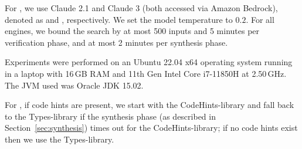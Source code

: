 \documentclass[conference]{IEEEtran}
\begin{document}
For \llm, we use Claude 2.1 and Claude 3 (both accessed via Amazon Bedrock), denoted as \llma and \llmb, respectively. We set the model temperature to $0.2$.
%
For all engines, we bound the search by at most 500 inputs and 5 minutes per verification phase, and at
most 2 minutes per synthesis phase. 

Experiments were performed on an Ubuntu
22.04 x64 operating system running in a laptop with 16\,GB RAM and
11th Gen Intel Core i7-11850H at 2.50\,GHz.  The JVM used was Oracle JDK 15.02.


For \tool, if code hints are present, we start with the CodeHints-library and fall back to the Types-library if the synthesis phase (as described in Section~\ref{sec:synthesis}) times out for the CodeHints-library; if no code hints exist then we use the Types-library.










\end{document}
